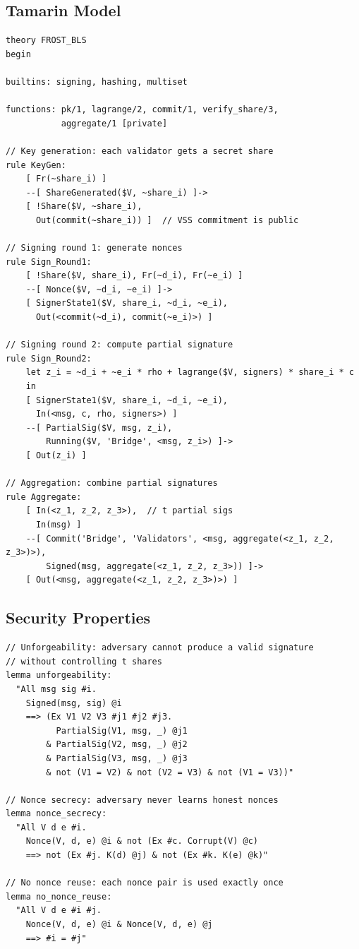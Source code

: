 \documentclass[11pt,a4paper]{article}
\begin{document}
\subsection{Tamarin Model}

\begin{lstlisting}[language=Tamarin,caption={FROST-BLS key generation in Tamarin}]
theory FROST_BLS
begin

builtins: signing, hashing, multiset

functions: pk/1, lagrange/2, commit/1, verify_share/3,
           aggregate/1 [private]

// Key generation: each validator gets a secret share
rule KeyGen:
    [ Fr(~share_i) ]
    --[ ShareGenerated($V, ~share_i) ]->
    [ !Share($V, ~share_i),
      Out(commit(~share_i)) ]  // VSS commitment is public

// Signing round 1: generate nonces
rule Sign_Round1:
    [ !Share($V, share_i), Fr(~d_i), Fr(~e_i) ]
    --[ Nonce($V, ~d_i, ~e_i) ]->
    [ SignerState1($V, share_i, ~d_i, ~e_i),
      Out(<commit(~d_i), commit(~e_i)>) ]

// Signing round 2: compute partial signature
rule Sign_Round2:
    let z_i = ~d_i + ~e_i * rho + lagrange($V, signers) * share_i * c
    in
    [ SignerState1($V, share_i, ~d_i, ~e_i),
      In(<msg, c, rho, signers>) ]
    --[ PartialSig($V, msg, z_i),
        Running($V, 'Bridge', <msg, z_i>) ]->
    [ Out(z_i) ]

// Aggregation: combine partial signatures
rule Aggregate:
    [ In(<z_1, z_2, z_3>),  // t partial sigs
      In(msg) ]
    --[ Commit('Bridge', 'Validators', <msg, aggregate(<z_1, z_2, z_3>)>),
        Signed(msg, aggregate(<z_1, z_2, z_3>)) ]->
    [ Out(<msg, aggregate(<z_1, z_2, z_3>)>) ]
\end{lstlisting}

\subsection{Security Properties}

\begin{lstlisting}[language=Tamarin,caption={FROST-BLS security properties}]
// Unforgeability: adversary cannot produce a valid signature
// without controlling t shares
lemma unforgeability:
  "All msg sig #i.
    Signed(msg, sig) @i
    ==> (Ex V1 V2 V3 #j1 #j2 #j3.
          PartialSig(V1, msg, _) @j1
        & PartialSig(V2, msg, _) @j2
        & PartialSig(V3, msg, _) @j3
        & not (V1 = V2) & not (V2 = V3) & not (V1 = V3))"

// Nonce secrecy: adversary never learns honest nonces
lemma nonce_secrecy:
  "All V d e #i.
    Nonce(V, d, e) @i & not (Ex #c. Corrupt(V) @c)
    ==> not (Ex #j. K(d) @j) & not (Ex #k. K(e) @k)"

// No nonce reuse: each nonce pair is used exactly once
lemma no_nonce_reuse:
  "All V d e #i #j.
    Nonce(V, d, e) @i & Nonce(V, d, e) @j
    ==> #i = #j"
\end{lstlisting}
\end{document}
